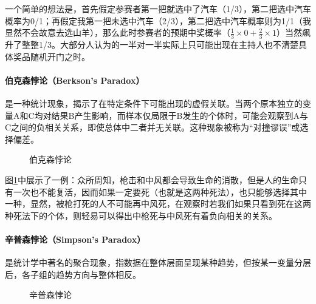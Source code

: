 一个简单的想法是，首先假定参赛者第一把就选中了汽车（1/3），第二把选中汽车概率为0/1；再假定我第一把未选中汽车（2/3），第二把选中汽车概率则为1/1（我显然不会故意去选山羊），那么此时参赛者的预期中奖概率（$\frac{1}{3} \times 0 + \frac{2}{3} \times 1$）当然飙升了整整1/3。大部分人认为的一半对一半实际上只可能出现在主持人也不清楚具体奖品随机开门之时。

\paragraph*{伯克森悖论（Berkson’s Paradox）}是一种统计现象，揭示了在特定条件下可能出现的虚假关联。当两个原本独立的变量A和C均对结果B产生影响，而样本仅局限于B发生的个体时，可能会观察到A与C之间的负相关关系，即使总体中二者并无关联。这种现象被称为“对撞谬误”或选择偏差。

\begin{figure}[ht]
	\centering
	\caption{伯克森悖论}
	\label{fig:berkson}
\end{figure}

图\ref{fig:berkson}中展示了一例：众所周知，枪击和中风都会导致生命的消散，但是人的生命只有一次也不能复活，因而如果一定要死（也就是这两种死法），也只能够选择其中一种，显然，被枪打死的人不可能再中风死，在观察时若我们如果只看到死在这两种死法下的个体，则轻易可以得出中枪死与中风死有着负向相关的关系。

\paragraph*{辛普森悖论（Simpson’s Paradox）}是统计学中著名的聚合现象，指数据在整体层面呈现某种趋势，但按某一变量分层后，各子组的趋势方向与整体相反。

\begin{figure}[ht]
	\centering
	\caption{辛普森悖论}
	\label{fig:simpson}
\end{figure}

